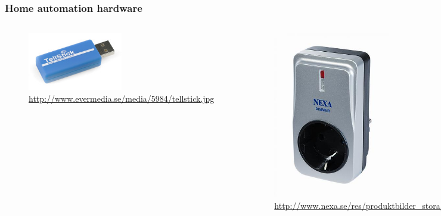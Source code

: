 \documentclass{beamer}
\begin{document}
\begin{frame}
\frametitle{Home automation hardware}

	\begin{columns}

	
		\begin{center}
			\begin{figure}
				\includegraphics[width=0.5\textwidth]{images/tellstick.jpg}
				\caption{\url{http://www.evermedia.se/media/5984/tellstick.jpg}}
				\label{fig:tellstick}
			\end{figure}
		\end{center}


		\begin{center}
			\begin{figure}
				\includegraphics[width=0.5\textwidth]{images/lycr-300.jpg}
				\caption{\url{http://www.nexa.se/res/produktbilder_stora/lyc_dimmer.jpg}}
				\label{fig:lycr-300}
			\end{figure}
		\end{center}

	\end{columns}

\end{frame}
\end{document}
